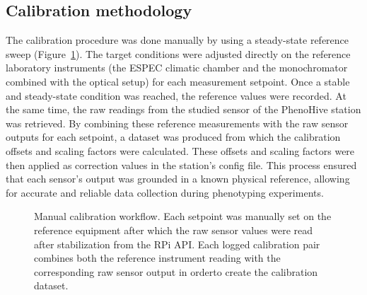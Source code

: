 \subsection{Calibration methodology}

The calibration procedure was done manually by using a steady-state reference sweep (Figure~\ref{fig:calibration-architecture}). The target conditions were adjusted directly on the reference laboratory instruments (the ESPEC climatic chamber and the monochromator combined with the optical setup) for each measurement setpoint. Once a stable and steady-state condition was reached, the reference values were recorded. 
At the same time, the raw readings from the studied sensor of the PhenoHive station was retrieved. By combining these reference measurements with the raw sensor outputs for each setpoint, a dataset was produced from which the calibration offsets and scaling factors were calculated. These offsets and scaling factors were then applied as correction values in the station's config file. This process ensured that each sensor's output was grounded in a known physical reference, allowing for accurate and reliable data collection during phenotyping experiments. 

\begin{figure}[H]
\centering
{}
\caption[Manual Calibration Workflow]{Manual calibration workflow. Each setpoint was manually set on the reference equipment after which the raw sensor values were read after stabilization from the RPi API. Each logged calibration pair combines both the  reference instrument reading with the corresponding raw sensor output in orderto create the calibration dataset.}
\label{fig:calibration-architecture}
\end{figure}


